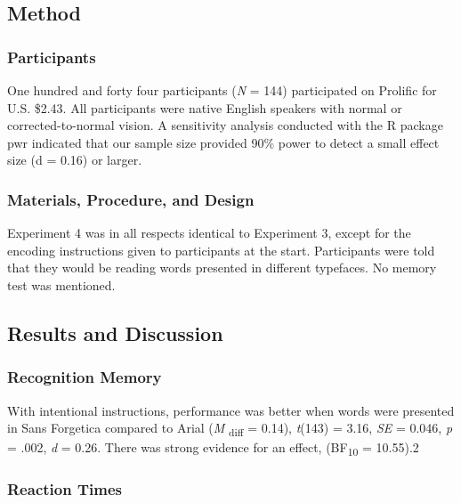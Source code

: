 \documentclass[
  english,
  man]{apa6}
\begin{document}
\hypertarget{method-1}{%
\subsection{Method}\label{method-1}}

\hypertarget{participants-1}{%
\subsubsection{Participants}\label{participants-1}}

One hundred and forty four participants (\emph{N} = 144) participated on Prolific for U.S. \$2.43. All participants were native English speakers with normal or corrected-to-normal vision. A sensitivity analysis conducted with the R package pwr indicated that our sample size provided 90\% power to detect a small effect size (d = 0.16) or larger.

\hypertarget{materials-procedure-and-design}{%
\subsubsection{Materials, Procedure, and Design}\label{materials-procedure-and-design}}

Experiment 4 was in all respects identical to Experiment 3,
except for the encoding instructions given to participants at the start. Participants were told that they would be reading words presented in different typefaces. No memory test was mentioned.

\hypertarget{results-and-discussion}{%
\subsection{Results and Discussion}\label{results-and-discussion}}

\hypertarget{recognition-memory}{%
\subsubsection{Recognition Memory}\label{recognition-memory}}

With intentional instructions, performance was better when words were presented in Sans Forgetica compared to Arial (\emph{M} \textsubscript{diff} = 0.14), \emph{t}(143) = 3.16, \emph{SE} = 0.046, \emph{p} = .002, \emph{d} = 0.26. There was strong evidence for an effect, (BF\textsubscript{10} = 10.55).2

\hypertarget{reaction-times}{%
\subsubsection{Reaction Times}\label{reaction-times}}
\end{document}

